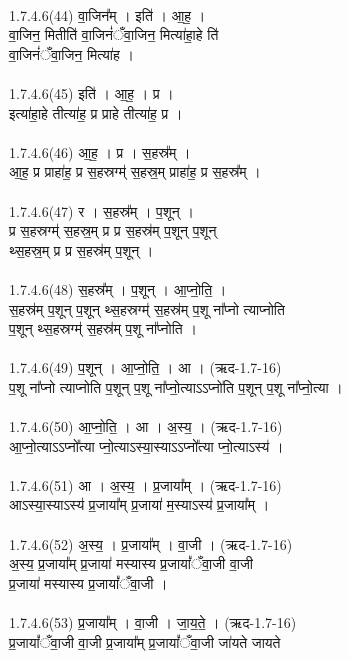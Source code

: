 \\
1.7.4.6(44)  वा॒जिन᳚म् । इति॑ । आ॒ह॒ ।\\
वा॒जिन॒ मितीति॑ वा॒जिनं॑ँवा॒जिन॒ मित्या॑हा॒हे ति॑ \\
वा॒जिनं॑ँवा॒जिन॒ मित्या॑ह ।\\
\\
1.7.4.6(45)  इति॑ । आ॒ह॒ । प्र ।\\
इत्या॑हा॒हे तीत्या॑ह॒ प्र प्राहे तीत्या॑ह॒ प्र ।\\
\\
1.7.4.6(46)  आ॒ह॒ । प्र । स॒हस्र᳚म् ।\\
आ॒ह॒ प्र प्राहा॑ह॒ प्र स॒हस्रग्म्॑ स॒हस्र॒म् प्राहा॑ह॒ प्र स॒हस्र᳚म् ।\\
\\
1.7.4.6(47)  र । स॒हस्र᳚म् । प॒शून् ।\\
प्र स॒हस्रग्म्॑ स॒हस्र॒म् प्र प्र स॒हस्र॑म् प॒शून् प॒शून्\\
थ्स॒हस्र॒म् प्र प्र स॒हस्र॑म् प॒शून् ।\\
\\
1.7.4.6(48)  स॒हस्र᳚म् । प॒शून् । आ॒प्नो॒ति॒ ।\\
स॒हस्र॑म् प॒शून् प॒शून् थ्स॒हस्रग्म्॑ स॒हस्र॑म् प॒शू ना᳚प्नो त्याप्नोति\\
प॒शून् थ्स॒हस्रग्म्॑ स॒हस्र॑म् प॒शू ना᳚प्नोति ।\\
\\
1.7.4.6(49)  प॒शून् । आ॒प्नो॒ति॒ । आ । (ऋद-1.7-16)\\
प॒शू ना᳚प्नो त्याप्नोति प॒शून् प॒शू ना᳚प्नो॒त्याऽऽप्नो॑ति प॒शून् प॒शू ना᳚प्नो॒त्या ।\\
\\
1.7.4.6(50)  आ॒प्नो॒ति॒ । आ । अ॒स्य॒ । (ऋद-1.7-16)\\
आ॒प्नो॒त्याऽऽप्नो᳚त्या प्नो॒त्याऽस्या॒स्याऽऽप्नो᳚त्या प्नो॒त्याऽस्य॑ ।\\
\\
1.7.4.6(51)  आ । अ॒स्य॒ । प्र॒जाया᳚म् । (ऋद-1.7-16)\\
आऽस्या॒स्याऽस्य॑ प्र॒जाया᳚म् प्र॒जाया॑ म॒स्याऽस्य॑ प्र॒जाया᳚म् ।\\
\\
1.7.4.6(52)  अ॒स्य॒ । प्र॒जाया᳚म् । वा॒जी । (ऋद-1.7-16)\\
अ॒स्य॒ प्र॒जाया᳚म् प्र॒जाया॑ मस्यास्य प्र॒जायां᳚ँवा॒जी वा॒जी \\
प्र॒जाया॑ मस्यास्य प्र॒जायां᳚ँवा॒जी ।\\
\\
1.7.4.6(53)  प्र॒जाया᳚म् । वा॒जी । जा॒य॒ते॒ । (ऋद-1.7-16)\\
प्र॒जायां᳚ँवा॒जी वा॒जी प्र॒जाया᳚म् प्र॒जायां᳚ँवा॒जी जा॑यते जायते\\
